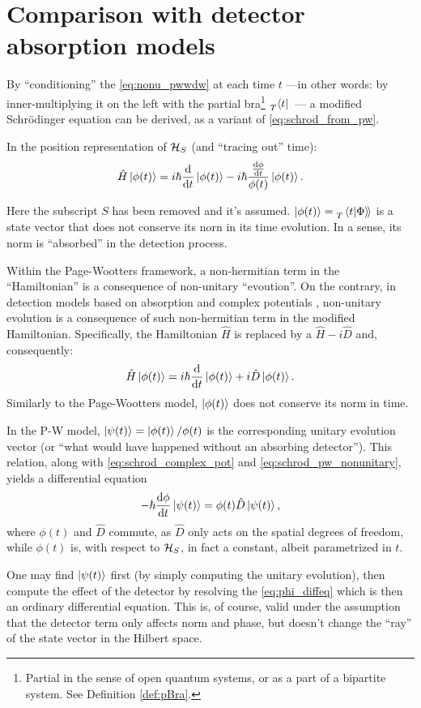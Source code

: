 \section{Comparison with detector absorption models}

By ``conditioning'' the \eqref{eq:nonu_pwwdw} at each time $t$
---in other words: by inner-multiplying it on the left with the partial bra\footnote{
  Partial in the sense of open quantum systems, or as a part of a bipartite system.
  See Definition \ref{def:pBra}.
}
$\prescript{}{T}{\bra{t}}$~---
a modified Schr{\"o}dinger equation
can be derived,
as a variant of \eqref{eq:schrod_from_pw}.

In the position representation of $\mathcal{H}_S$ (and ``tracing out'' time):
\begin{equation}\label{eq:schrod_pw_nonunitary}
  \hat{H} \ket{\phi(t)} = i\hbar\dv{t}\ket{\phi(t)} -i\hbar\frac{\dv{\phi}{t}}{\phi(t)}\ket{\phi(t)} \text{.}
\end{equation}

Here the subscript $S$ has been removed and it's assumed.
$\ket{\phi(t)} = \prescript{}{T}{\left.\left\langle t \middle| \Phi \right\rangle\!\right\rangle}$
is a state vector that does not conserve its norn in its time evolution.
In a sense, its norm is ``absorbed'' in the detection process.

Within the Page-Wootters framework, a non-hermitian term in the ``Hamiltonian''
is a consequence of non-unitary ``evoution''.
On the contrary, in detection models based on absorption and complex potentials
\parencite{RuschhauptAbsorption}, non-unitary evolution is a consequence
of such non-hermitian term in the modified Hamiltonian.
Specifically, the Hamiltonian $\hat{H}$ is replaced by a $\hat{H} - i\hat{D}$
and, consequently:
\begin{equation}\label{eq:schrod_complex_pot}
  \hat{H} \ket{\phi(t)} = i\hbar\dv{t}\ket{\phi(t)} +i\hat{D}\ket{\phi(t)} \text{.}
\end{equation}
Similarly to the Page-Wootters model, $\ket{\phi(t)}$ does not conserve its norm in time.

In the P-W model, $\ket{\psi(t)} = \ket{\phi(t)}/\phi(t)$
is the corresponding unitary evolution vector
(or ``what would have happened without an absorbing detector'').
This relation, along with \eqref{eq:schrod_complex_pot} and \eqref{eq:schrod_pw_nonunitary},
yields a differential equation
\begin{equation}\label{eq:phi_diffeq}
  -\hbar\dv{\phi}{t}\ket{\psi(t)} = \phi(t) \hat{D} \ket{\psi(t)} \text{,}
\end{equation}
where $\phi(t)$ and $\hat{D}$ commute, as $\hat{D}$ only acts on the spatial degrees of freedom,
while $\phi(t)$ is, with respect to $\mathcal{H}_S$, in fact a constant, albeit parametrized in $t$.

One may find $\ket{\psi(t)}$ first (by simply computing the unitary evolution),
then compute the effect of the detector by resolving the \eqref{eq:phi_diffeq}
which is then an ordinary differential equation. This is, of course, valid
under the assumption that the detector term only affects norm and phase,
but doesn't change the ``ray'' of the state vector in the Hilbert space. 
